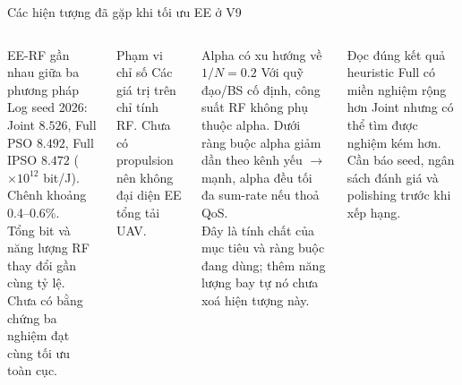 \documentclass[t,aspectratio=169]{beamer}
\begin{document}
\begin{frame}{Các hiện tượng đã gặp khi tối ưu EE ở V9}
\vspace{-8pt}
\begin{columns}[T]
\begin{block}{EE-RF gần nhau giữa ba phương pháp}\small
Log seed 2026: Joint $8.526$, Full PSO $8.492$, Full IPSO $8.472$ ($\times10^{12}$ bit/J). Chênh khoảng 0.4--0.6\%.\\[4pt]
Tổng bit và năng lượng RF thay đổi gần cùng tỷ lệ. Chưa có bằng chứng ba nghiệm đạt cùng tối ưu toàn cục.
\end{block}
\begin{alertblock}{Phạm vi chỉ số}\small
Các giá trị trên chỉ tính RF. Chưa có propulsion nên không đại diện EE tổng tải UAV.
\end{alertblock}
\begin{block}{Alpha có xu hướng về $1/N=0.2$}\small
Với quỹ đạo/BS cố định, công suất RF không phụ thuộc alpha. Dưới ràng buộc alpha giảm dần theo kênh yếu $\to$ mạnh, alpha đều tối đa sum-rate nếu thoả QoS.\\[4pt]
Đây là tính chất của mục tiêu và ràng buộc đang dùng; thêm năng lượng bay tự nó chưa xoá hiện tượng này.
\end{block}
\begin{block}{Đọc đúng kết quả heuristic}\scriptsize
Full có miền nghiệm rộng hơn Joint nhưng có thể tìm được nghiệm kém hơn. Cần báo seed, ngân sách đánh giá và polishing trước khi xếp hạng.
\end{block}
\end{columns}
\end{frame}
\end{document}
